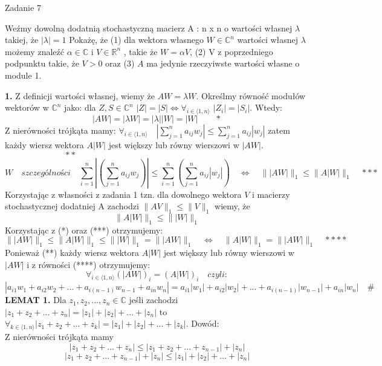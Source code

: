 \documentclass[a4paper]{article}
\newcommand*{\field}[1]{\mathbb{#1}}
\begin{document}
\begin{center}
{\fontsize{20}{20}\selectfont Zadanie 7}
\end{center}

Weźmy dowolną dodatnią stochastyczną macierz A : n x n o wartości własnej $\lambda$ takiej, że $|\lambda| = 1$ Pokażę, że (1) dla wektora własnego $W \in \field{C}^{n}$ wartości własnej $\lambda$ możemy znaleźć $\alpha \in \field{C}$ i $V \in \field{R}^{n}$ , takie że $W = \alpha V$, (2) V z poprzedniego podpunktu takie, że $V > 0$ oraz (3) $A$ ma jedynie rzeczyiwste wartości własne o module 1.\\
\begin{adjustwidth}{30pt}{30pt}
\textbf{1.} Z definicji wartości własnej, wiemy że $AW = \lambda W$. Określmy równość modułów wektorów w $\field{C}^{n}$ jako: dla $Z,S \in \field{C}^{n}$ $|Z| = |S| \Leftrightarrow \forall_{{i}\in \langle 1,n\rangle}$ $|Z_{i}| = |S_{i}|$. Wtedy:
$$|AW| = |\lambda W| = |\lambda| |W| = |W| \quad \quad *$$
Z nierówności trójkąta mamy: $\forall_{i \in \langle 1,n\rangle} \quad |\sum_{j=1}^{n}a_{ij}w_{j}| \leq \sum_{j=1}^{n}a_{ij}|w_{j}|$ zatem każdy wiersz wektora $A|W|$ jest większy lub równy wierszowi w $|AW|$.$\quad \quad \quad \quad \quad \quad  \quad **$
$$W \quad szczególności \quad \sum_{i=1}^{n}|(\sum_{j=1}^{n}a_{ij}w_{j})| \leq \sum_{i=1}^{n}(\sum_{j=1}^{n}a_{ij}|w_{j}|) \quad \Leftrightarrow \quad \| |AW| \|_{1} \leq \| A|W| \|_{1} \quad ***$$
Korzystając z własności z zadania 1 tzn. dla dowolnego wektora $V$ i macierzy stochastycznej dodatniej A zachodzi $ \| AV \|_{1} \leq \| V \|_{1}$ wiemy, że
$$\| A|W| \|_{1} \leq \| |W| \|_{1}$$
Korzystając z (*) oraz (***) otrzymujemy:
$$\| |AW| \|_{1} \leq \| A|W| \|_{1} \leq \| |W| \|_{1} = \| |AW| \|_{1} \quad \Leftrightarrow \quad
\| A|W| \|_{1} = \| |AW| \|_{1} \quad ****$$
Ponieważ (**) każdy wiersz wektora $A|W|$ jest większy lub równy wierszowi w $|AW|$ i z równości (****) otrzymujemy:
$$ \forall_{ i \in \langle 1,n\rangle} (|AW|)_{i} = (A|W|)_{i} \quad czyli:$$
$$|a_{i1}w_{1} + a_{i2}w_{2} + ... + a_{i(n-1)}w_{n-1} + a_{in}w_{n}| = a_{i1}|w_{1}| + a_{i2}|w_{2}| + ... + a_{i(n-1)}|w_{n-1}| + a_{in}|w_{n}| \quad \#$$
\textbf{LEMAT 1.} Dla $z_{1},z_{2},...,z_{n} \in \field{C}$ jeśli zachodzi $|z_{1} + z_{2} + ... + z_{n}| = |z_{1}| + |z_{2}| + ... + |z_{n}|$ to $ \forall_{ k \in \langle 1,n\rangle} |z_{1} + z_{2} + ... + z_{k}| = |z_{1}| + |z_{2}| + ... + |z_{k}|$. Dowód:\\
Z nierówności trójkąta mamy $$|z_{1} + z_{2} + ... + z_{n}| \leq |z_{1} + z_{2} + ... + z_{n-1}| + |z_{n}|$$ $$|z_{1} + z_{2} + ... + z_{n-1}| + |z_{n}| \leq |z_{1}| + |z_{2}| + ... + |z_{n}|$$

\end{adjustwidth}
\end{document}
